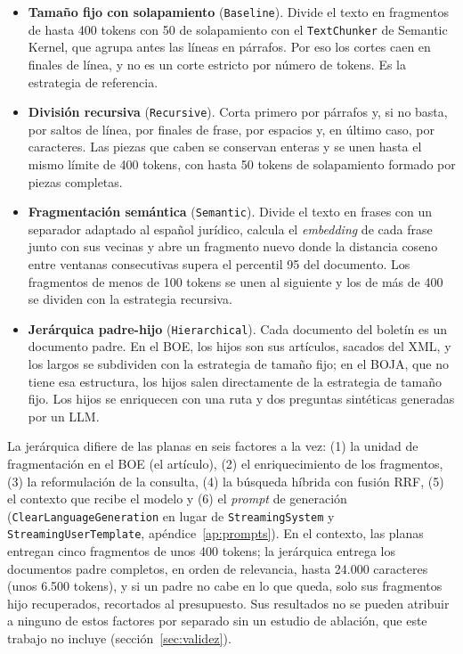 \begin{itemize}
  \item \textbf{Tamaño fijo con solapamiento} (\texttt{Baseline}). Divide el texto en fragmentos de hasta 400 tokens con 50 de solapamiento con el \texttt{TextChunker} de Semantic Kernel, que agrupa antes las líneas en párrafos. Por eso los cortes caen en finales de línea, y no es un corte estricto por número de tokens. Es la estrategia de referencia.
  \item \textbf{División recursiva} (\texttt{Recursive}). Corta primero por párrafos y, si no basta, por saltos de línea, por finales de frase, por espacios y, en último caso, por caracteres. Las piezas que caben se conservan enteras y se unen hasta el mismo límite de 400 tokens, con hasta 50 tokens de solapamiento formado por piezas completas.
  \item \textbf{Fragmentación semántica} (\texttt{Semantic}). Divide el texto en frases con un separador adaptado al español jurídico, calcula el \emph{embedding} de cada frase junto con sus vecinas y abre un fragmento nuevo donde la distancia coseno entre ventanas consecutivas supera el percentil 95 del documento. Los fragmentos de menos de 100 tokens se unen al siguiente y los de más de 400 se dividen con la estrategia recursiva.
  \item \textbf{Jerárquica padre-hijo} (\texttt{Hierarchical}). Cada documento del boletín es un documento padre. En el BOE, los hijos son sus artículos, sacados del XML, y los largos se subdividen con la estrategia de tamaño fijo; en el BOJA, que no tiene esa estructura, los hijos salen directamente de la estrategia de tamaño fijo. Los hijos se enriquecen con una ruta y dos preguntas sintéticas generadas por un LLM.
\end{itemize}

La jerárquica difiere de las planas en seis factores a la vez: (1) la unidad de fragmentación en el BOE (el artículo), (2) el enriquecimiento de los fragmentos, (3) la reformulación de la consulta, (4) la búsqueda híbrida con fusión RRF, (5) el contexto que recibe el modelo y (6) el \emph{prompt} de generación (\texttt{ClearLanguageGeneration} en lugar de \texttt{StreamingSystem} y \texttt{StreamingUserTemplate}, apéndice~\ref{ap:prompts}). En el contexto, las planas entregan cinco fragmentos de unos 400 tokens; la jerárquica entrega los documentos padre completos, en orden de relevancia, hasta 24.000 caracteres (unos 6.500 tokens), y si un padre no cabe en lo que queda, solo sus fragmentos hijo recuperados, recortados al presupuesto. Sus resultados no se pueden atribuir a ninguno de estos factores por separado sin un estudio de ablación, que este trabajo no incluye (sección~\ref{sec:validez}).


